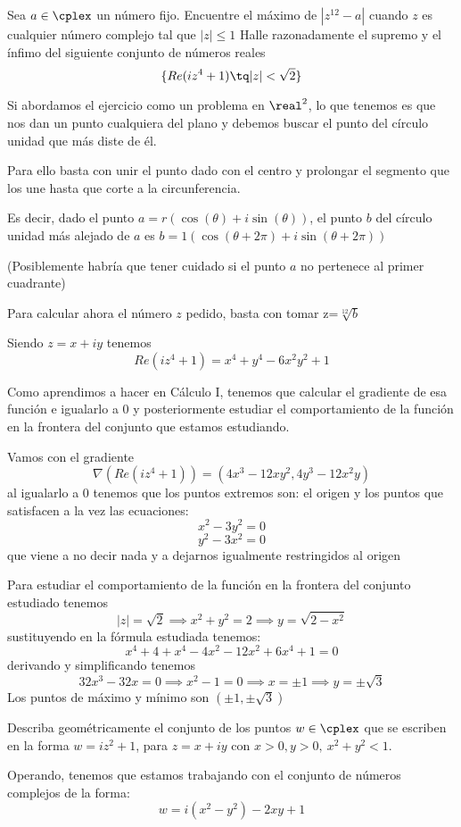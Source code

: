 \begin{problem}[19]
\ppart Sea $a \in \cplex$ un número fijo. Encuentre el máximo de $|z^{12}-a|$ cuando $z$ es cualquier número complejo tal que $|z|\leq 1$
\ppart Halle razonadamente el supremo y el ínfimo del siguiente conjunto de números reales
\[\{Re(iz^4+1) \tq |z|<\sqrt{2}\}\]

\solution
{}

\spart
Si abordamos el ejercicio como un problema en $\real^2$, lo que tenemos es que nos dan un punto cualquiera del plano y debemos buscar el punto del círculo unidad que más diste de él.

Para ello basta con unir el punto dado con el centro y prolongar el segmento que los une hasta que corte a la circunferencia.

Es decir, dado el punto $a=r\left(\cos(\theta)+i\sin(\theta)\right)$, el punto $b$ del círculo unidad más alejado de $a$ es $b=1\left(\cos(\theta +2π)+i\sin(\theta +2π)\right)$

(Posiblemente habría que tener cuidado si el punto $a$ no pertenece al primer cuadrante)

Para calcular ahora el número $z$ pedido, basta con tomar z=$\sqrt[12]{b}$

\spart
Siendo $z=x+iy$ tenemos
\[Re(iz^4+1)=x^4+y^4-6x^2y^2+1\]

Como aprendimos a hacer en Cálculo I, tenemos que calcular el gradiente de esa función e igualarlo a 0 y posteriormente estudiar el comportamiento de la función en la frontera del conjunto que estamos estudiando.

Vamos con el gradiente
\[\nabla \left(Re(iz^4+1)\right) = \left(4x^3-12xy^2, 4y^3-12x^2y\right)\]
al igualarlo a 0 tenemos que los puntos extremos son: el origen y los puntos que satisfacen a la vez las ecuaciones:
\[x^2-3y^2=0\]
\[y^2-3x^2=0\]
que viene a no decir nada y a dejarnos igualmente restringidos al origen

Para estudiar el comportamiento de la función en la frontera del conjunto estudiado tenemos
\[|z| = \sqrt{2} \implies x^2+y^2 =2 \implies y=\sqrt{2-x^2} \]
sustituyendo en la fórmula estudiada tenemos:
\[x^4+4+x^4-4x^2-12x^2+6x^4 +1 =0\]
derivando y simplificando tenemos
\[32x^3-32x=0 \implies x^2-1=0 \implies x=\pm 1 \implies y = \pm \sqrt{3}\]
Los puntos de máximo y mínimo son $(\pm 1, \pm \sqrt{3})$

\end{problem}

\begin{problem}[20]
Describa geométricamente el conjunto de los puntos $w \in \cplex$ que se escriben en la forma $w=iz^2+1$, para $z=x+iy$ con $x>0, y>0, \ x^2+y^2<1$.

\solution

Operando, tenemos que estamos trabajando con el conjunto de números complejos de la forma:
\[w=i(x^2-y^2)-2xy+1\]


\end{problem}

